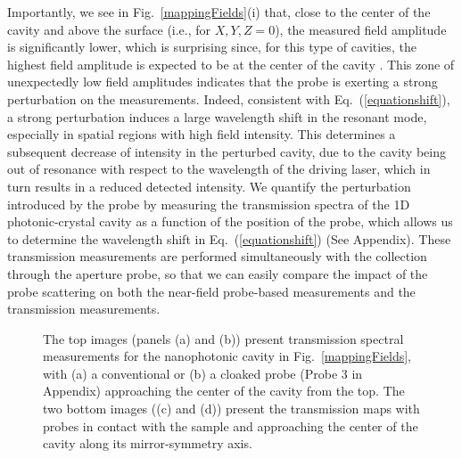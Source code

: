 \documentclass{osa-article}
\begin{document}
	Importantly, we see in Fig.~\ref{mappingFields}(i) that, close to the center of the cavity and above the surface (i.e., for $X,Y,Z=0$), the measured field amplitude is significantly lower, which is surprising since, for this type of cavities, the highest field amplitude is expected to be at the center of the cavity \cite{Conteduca_2017}. This zone of unexpectedly low field amplitudes indicates that the probe is exerting a strong perturbation on the measurements. Indeed, consistent with Eq.~(\ref{equationshift}), a strong perturbation induces a large wavelength shift in the resonant mode, especially in spatial regions with high field intensity. This determines a subsequent decrease of intensity in the perturbed cavity, due to the cavity being out of resonance with respect to the wavelength of the driving laser, which in turn results in a reduced detected intensity. We quantify the perturbation introduced by the probe by measuring the transmission spectra of the 1D photonic-crystal cavity as a function of the position of the probe, which allows us to determine the wavelength shift in Eq.~(\ref{equationshift}) (See Appendix). These transmission measurements are performed simultaneously with the collection through the aperture probe, so that we can easily compare the impact of the probe scattering on both the near-field probe-based measurements and the transmission measurements.\par
	
	\begin{figure}[htb!]
		\caption{The top images (panels (a) and (b)) present transmission spectral measurements for the nanophotonic cavity in Fig.~\ref{mappingFields}, with (a) a conventional or (b) a cloaked probe (Probe 3 in Appendix) approaching the center of the cavity from the top. The two bottom images ((c) and (d)) present the transmission maps with probes in contact with the sample and approaching the center of the cavity along its mirror-symmetry axis.}\label{figure2shifts}
	\end{figure}
	
\end{document}
